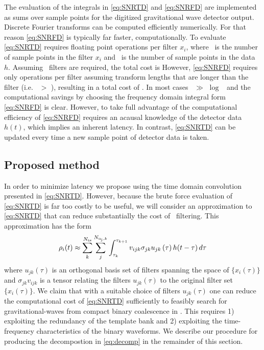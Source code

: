 The evaluation of the integrals in \eqref{eq:SNRTD} and \eqref{eq:SNRFD} are
implemented as sums over sample points for the digitized gravitational wave
detector output.  Discrete Fourier transforms can be computed efficiently
numerically.  For that reason \eqref{eq:SNRFD} is typically far faster,
computationally.  To evaluate \eqref{eq:SNRTD} requires \order{\tmpsamps
\hoftsamps} floating point operations per filter $x_i$, where \tmpsamps\ is the
number of sample points in the filter $x_i$ and \hoftsamps\ is the number of
sample points in the data $h$.  Assuming \numtmps\ filters are required, the
total cost is \order{\numtmps \tmpsamps \hoftsamps} However, \eqref{eq:SNRFD}
requires only \order{\hoftsamps \log \hoftsamps} operations per filter assuming
transform lengths that are longer than the filter (i.e. \hoftsamps\ $>$
\tmpsamps), resulting in a total cost of \order{\numtmps \hoftsamps \log
\hoftsamps}.  In most cases \tmpsamps\ $\gg$ $\log$ \hoftsamps\ and the
computational savings by choosing the frequency domain integral form
\eqref{eq:SNRFD} is clear.  However, to take full advantage of the
computational efficiency of \eqref{eq:SNRFD} requires an acausal knowledge of
the detector data $h(t)$, which implies an inherent latency.  In contrast,
\eqref{eq:SNRTD} can be updated every time a new sample point of detector data
is taken.  

\subsection{Proposed method}

In order to minimize latency we propose using the time domain convolution
presented in \eqref{eq:SNRTD}.  However, because the brute force evaluation of
\eqref{eq:SNRTD} is far too costly to be useful, we will consider an
approximation to \eqref{eq:SNRTD} that can reduce substantially the cost of
\realtime\ filtering. This approximation has the form
%
%
\begin{equation}
\rho_i(t) \approx \sum_k^{{N}_{\mathrm{ts}}} \sum_j^{N_{\mathrm{u_j},k}} 
	\int_{\tau_{k}}^{\tau_{k+1}} v_{ijk} \sigma_{jk} u_{jk}\,(\tau) \, h(t-\tau) \, d \tau \label{eq:decomp}
\end{equation} 
%
%
where $u_{jk}(\tau)$ is an orthogonal basis set of filters spanning the space
of $\{x_i(\tau)\}$ and $\sigma_{jk} v_{ijk}$ is a tensor relating the filters
$u_{jk}(\tau)$ to the original filter set $\{x_i(\tau)\}$.  We claim that with
a suitable choice of filters $u_{jk}(\tau)$ one can reduce the computational
cost of \eqref{eq:SNRTD} sufficiently to feasibly search for
gravitational-waves from compact binary coalescence in \realtime.  This
requires 1) exploiting the redundancy of the template bank and 2) exploiting
the time-frequency characteristics of the binary waveforms.  We describe our
procedure for producing the decompostion in \eqref{eq:decomp} in the remainder
of this section.

